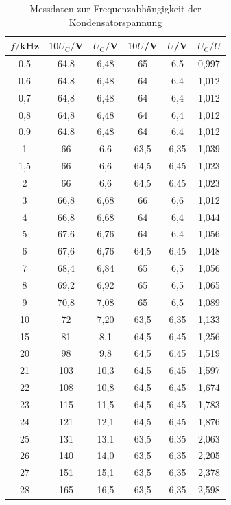\begin{table}
\centering
\caption{Messdaten zur Frequenzabhängigkeit der Kondensatorspannung}
\label{tab:amplitude1}
\begin{tabular}{c c c c c c}
\toprule
$f/$kHz & $10U_\mathrm{C}/$V & $U_\mathrm{C}/$V & $10U$/V & $U$/V & $U_\mathrm{C}/U$ \\
\midrule
  0,5	&  64,8  &  6,48 & 65   & 6,5 & 0,997 \\
  0,6	&  64,8  &  6,48 & 64   & 6,4 & 1,012 \\
  0,7	&  64,8  &  6,48 & 64   & 6,4 & 1,012 \\
  0,8	&  64,8  &  6,48 & 64   & 6,4 & 1,012 \\
  0,9	&  64,8  &  6,48 & 64   & 6,4 & 1,012 \\
  1	  &  66	   &  6,6  & 63,5 & 6,35& 1,039 \\
  1,5	&  66	   &  6,6  & 64,5 & 6,45& 1,023 \\
  2	  &  66	   &  6,6  & 64,5 & 6,45& 1,023 \\
  3	  &  66,8	 &  6,68 & 66   & 6,6 & 1,012 \\
  4	  &  66,8	 &  6,68 & 64   & 6,4 & 1,044 \\
  5	  &  67,6	 &  6,76 & 64   & 6,4 & 1,056 \\
  6	  &  67,6	 &  6,76 & 64,5 & 6,45& 1,048 \\
  7	  &  68,4	 &  6,84 & 65   & 6,5 & 1,056 \\
  8	  &  69,2	 &  6,92 & 65   & 6,5 & 1,065 \\
  9	  &  70,8	 &  7,08 & 65   & 6,5 & 1,089 \\
 10	  &  72	   &  7,20 & 63,5 & 6,35& 1,133 \\
 15	  &  81	   &  8,1  & 64,5 & 6,45& 1,256 \\
 20	  &  98	   &  9,8  & 64,5 & 6,45& 1,519 \\
 21	  & 103	   & 10,3  & 64,5 & 6,45& 1,597 \\
 22	  & 108	   & 10,8  & 64,5 & 6,45& 1,674 \\
 23	  & 115	   & 11,5  & 64,5 & 6,45& 1,783 \\
 24	  & 121	   & 12,1  & 64,5 & 6,45& 1,876 \\
 25	  & 131	   & 13,1  & 63,5 & 6,35& 2,063 \\
 26	  & 140	   & 14,0  & 63,5 & 6,35& 2,205 \\
 27	  & 151	   & 15,1  & 63,5 & 6,35& 2,378 \\
 28	  & 165	   & 16,5  & 63,5 & 6,35& 2,598 \\

\end{tabular}
\end{table}
